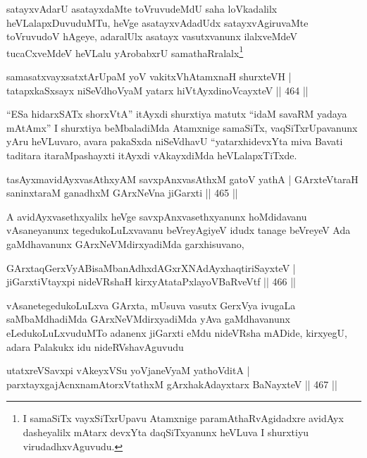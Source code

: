\begin{artha}
satayxvAdarU asatayxdaMte toVruvudeMdU saha loVkadalilx
heVLalapxDuvuduMTu, heVge asatayxvAdadUdx satayxvAgiruvaMte toVruvudoV
hAgeye, adaralUlx asatayx vasutxvanunx ilalxveMdeV tucaCxveMdeV
heVLalu yArobabxrU samathaRralalx\footnote{I samaSiTx
 vayxSiTxrUpavu Atamxnige paramAthaRvAgidadxre avidAyx dasheyalilx
 mAtarx devxYta daqSiTxyanunx heVLuva I shurxtiyu virudadhxvAguvudu.}
\end{artha}

\begin{shl}
samasatxvayxsatxtArUpaM yoV vakitxVhA\s \s tamxnaH shurxteVH |
tatapxkaSxsayx niSeVdhoV\s yaM yatarx hiVtAyxdinoVcayxteV \hfill || 464 ||
\end{shl}

\begin{artha}
``ESa hidarxSATx shorxVtA'' itAyxdi shurxtiya matutx ``idaM savaRM yadaya mAtAmx'' I shurxtiya beMbaladiMda Atamxnige samaSiTx, vaqSiTxrUpavanunx yAru heVLuvaro, avara pakaSxda niSeVdhavU ``yatarxhidevxYta miva Bavati taditara itaraMpashayxti itAyxdi vAkayxdiMda heVLalapxTiTxde.
\end{artha}

\begin{shl}
tasAyxmavidAyxvasAthxyAM savxpAnxvasAthxM gatoV yathA |
GArxteVtaraH saninxtaraM ganadhxM GArxNeVna jiGarxti \hfill || 465 ||
\end{shl}

\begin{artha}
A avidAyxvasethxyalilx heVge savxpAnxvasethxyanunx hoMdidavanu
vAsaneyanunx tegedukoLuLxvavanu beVreyAgiyeV idudx tanage beVreyeV Ada
gaMdhavanunx GArxNeVMdirxyadiMda garxhisuvano,
\end{artha}

\begin{shl}
GArxtaqGerxVyABisaMbanAdhxdAGxrXNAdAyxhaqtiriSayxteV |
jiGarxtiVtayxpi nideVRshaH kirxyAtataPxlayoVBaRveVtf \hfill || 466 ||
\end{shl}

\begin{artha}
vAsanetegedukoLuLxva GArxta, mUsuva vasutx GerxVya ivugaLa
saMbaMdhadiMda GArxNeVMdirxyadiMda yAva gaMdhavanunx eLedukoLuLxvuduMTo
adanenx jiGarxti eMdu nideVRsha mADide, kirxyegU, adara Palakukx idu nideRVshavAguvudu
\end{artha}

\begin{shl}
utatxreVSavxpi vAkeyxVSu yoVjaneVyaM yathoVditA |
parxtayxgajAcnxnamAtorxVtathxM gArxhakAdayxtarx BaNayxteV \hfill || 467 ||
\end{shl}

